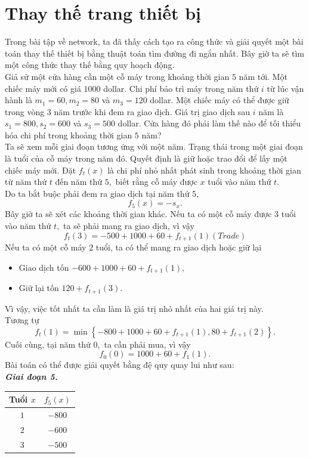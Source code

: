 \documentclass[12pt,a4paper]{article}
\begin{document}
\section{Thay thế trang thiết bị}
Trong bài tập về network, ta đã thấy cách tạo ra công thức và giải quyết một bài toán thay thế thiết bị bằng thuật toán tìm đường đi ngắn nhất. Bây giờ ta sẽ tìm một công thức thay thế bằng quy hoạch động.\\
Giả sử một cửa hàng cần một cỗ máy trong khoảng thời gian \(5\) năm tới. Một chiếc máy mới có giá \(1000\) dollar. Chi phí bảo trì máy trong năm thứ \(i\) từ lúc vận hành là \(m_1 = 60, m_2 = 80\) và \(m_3 = 120\) dollar. Một chiếc máy có thể được giữ trong vòng \(3\) năm trước khi đem ra giao dịch. Giá trị giao dịch sau \(i\) năm là \(s_1 = 800, s_2 = 600\) và \(s_3 = 500\) dollar. Cửa hàng đó phải làm thế nào để tối thiểu hóa chi phí trong khoảng thời gian \(5\) năm?\\
Ta sẽ xem mỗi giai đoạn tương ứng với một năm. Trạng thái trong một giai đoạn là tuổi của cỗ máy trong năm đó. Quyết định là giữ hoặc trao đổi để lấy một chiếc máy mới. Đặt \({f_t}\left( x \right)\) là chi phí nhỏ nhất phát sinh trong khoảng thời gian từ năm thứ \(t\) đến năm thứ \(5,\) biết rằng cỗ máy được \(x\) tuổi vào năm thứ \(t.\)\\
Do ta bắt buộc phải đem ra giao dịch tại năm thứ \(5,\) 
\[{f_5}\left( x \right) =  - {s_x}.\]
Bây giờ ta sẽ xét các khoảng thời gian khác. Nếu ta có một cỗ máy được \(3\) tuổi vào năm thứ \(t,\) ta sẽ phải mang ra giao dịch, vì vậy
\[{f_t}\left( 3 \right) =  - 500 + 1000 + 60 + {f_{t + 1}}\left( 1 \right)\left( {Trade} \right)\]
Nếu ta có một cỗ máy \(2\) tuổi, ta có thể mang ra giao dịch hoặc giữ lại
\begin{itemize}
\item Giao dịch tốn \( - 600 + 1000 + 60 + {f_{t + 1}}\left( 1 \right),\)
\item Giữ lại tốn \(120 + {f_{t + 1}}\left( 3 \right).\)
\end{itemize}
Vì vậy, việc tốt nhất ta cần làm là giá trị nhỏ nhất của hai giá trị này.\\
Tương tự
\[{f_t}\left( 1 \right) = \min \left\{ { - 800 + 1000 + 60 + {f_{t + 1}}\left( 1 \right),80 + {f_{t + 1}}\left( 2 \right)} \right\}.\]
Cuối cùng, tại năm thứ \(0,\) ta cần phải mua, vì vậy
\[{f_0}\left( 0 \right) = 1000 + 60 + {f_1}\left( 1 \right).\]
Bài toán có thể được giải quyết bằng đệ quy quay lui như sau:\\
\textbf{\textit{Giai đoạn 5.}}
\begin{center}
\begin{table}[H]
\begin{tabular}{|c|c|}
\hline 
Tuổi \(x\) & \(f_5 \left( x \right)\) \\ 
\hline 
\(1\) & \(-800\) \\ 
\hline 
\(2\) & \(-600\) \\ 
\hline 
\(3\) & \(-500\) \\ 
\hline 
\end{tabular} 
\end{table}
\end{center}
\end{document}
